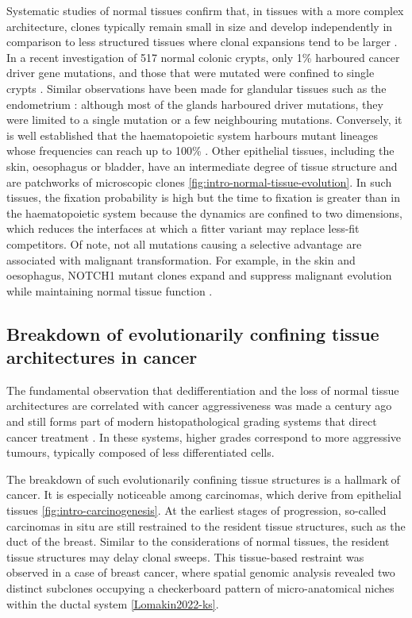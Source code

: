 Systematic studies of normal tissues confirm that, in tissues with a more complex architecture, clones typically remain small in size and develop independently in comparison to less structured tissues where clonal expansions tend to be larger \parencite{Li2021-th}. In a recent investigation of 517 normal colonic crypts, only 1\% harboured cancer driver gene mutations, and those that were mutated were confined to single crypts \parencite{Lee-Six2019-fy}. Similar observations have been made for glandular tissues such as the endometrium \parencite{Moore2020-qb}: although most of the glands harboured driver mutations, they were limited to a single mutation or a few neighbouring mutations. Conversely, it is well established that the haematopoietic system harbours mutant lineages whose frequencies can reach up to 100\% \parencite{Genovese2014-wm,Jaiswal2014-tz}. Other epithelial tissues, including the skin, oesophagus or bladder, have an intermediate degree of tissue structure and are patchworks of microscopic clones \parencite{Moore2021-yr,Martincorena2015-yu,Martincorena2018-rl,Lawson2020-as} \cref{fig:intro-normal-tissue-evolution}. In such tissues, the fixation probability is high but the time to fixation is greater than in the haematopoietic system because the dynamics are confined to two dimensions, which reduces the interfaces at which a fitter variant may replace less-fit competitors. Of note, not all mutations causing a selective advantage are associated with malignant transformation. For example, in the skin and oesophagus, NOTCH1 mutant clones expand and suppress malignant evolution while maintaining normal tissue function \parencite{Martincorena2015-yu,Martincorena2018-rl, Colom2021-mk,Fowler2021-bl, Abby2021-ik}.

\subsection*{Breakdown of evolutionarily confining tissue architectures in cancer
}
The fundamental observation that dedifferentiation and the loss of normal tissue architectures are correlated with cancer aggressiveness was made a century ago and still forms part of modern histopathological grading systems that direct cancer treatment \parencite{Louis2007-ia,Elston1991-md,Epstein2016-un,Greenough1925-wg}. In these systems, higher grades correspond to more aggressive tumours, typically composed of less differentiated cells.

The breakdown of such evolutionarily confining tissue structures is a hallmark of cancer. It is especially noticeable among carcinomas, which derive from epithelial tissues \cref{fig:intro-carcinogenesis}. At the earliest stages of progression, so-called carcinomas in situ are still restrained to the resident tissue structures, such as the duct of the breast. Similar to the considerations of normal tissues, the resident tissue structures may delay clonal sweeps. This tissue-based restraint was observed in a case of breast cancer, where spatial genomic analysis revealed two distinct subclones occupying a checkerboard pattern of micro-anatomical niches within the ductal system \cref{Lomakin2022-ks}.

